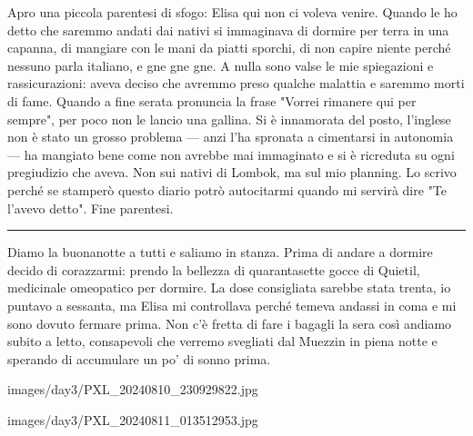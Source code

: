 Apro una piccola parentesi di sfogo: Elisa qui non ci voleva venire. Quando le ho detto che saremmo andati dai nativi si immaginava di dormire per terra in una capanna, di mangiare con le mani da piatti sporchi, di non capire niente perché nessuno parla italiano, e gne gne gne. A nulla sono valse le mie spiegazioni e rassicurazioni: aveva deciso che avremmo preso qualche malattia e saremmo morti di fame. Quando a fine serata pronuncia la frase "Vorrei rimanere qui per sempre", per poco non le lancio una gallina. Si è innamorata del posto, l'inglese non è stato un grosso problema — anzi l'ha spronata a cimentarsi in autonomia — ha mangiato bene come non avrebbe mai immaginato e si è ricreduta su ogni pregiudizio che aveva. Non sui nativi di Lombok, ma sul mio planning. Lo scrivo perché se stamperò questo diario potrò autocitarmi quando mi servirà dire "Te l'avevo detto". Fine parentesi.

\begin{center}
    \noindent\rule{0.6\textwidth}{0.4pt}
\end{center}

Diamo la buonanotte a tutti e saliamo in stanza. Prima di andare a dormire decido di corazzarmi: prendo la bellezza di quarantasette gocce di Quietil, medicinale omeopatico per dormire. La dose consigliata sarebbe stata trenta, io puntavo a sessanta, ma Elisa mi controllava perché temeva andassi in coma e mi sono dovuto fermare prima. Non c'è fretta di fare i bagagli la sera così andiamo subito a letto, consapevoli che verremo svegliati dal Muezzin in piena notte e sperando di accumulare un po' di sonno prima.


\pagestyle{empty} %

                      {images/day3/PXL_20240810_230929822.jpg}

%

                      {images/day3/PXL_20240811_013512953.jpg}
%

%

%


